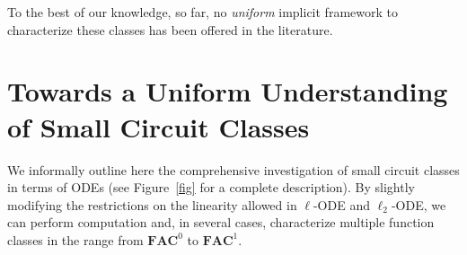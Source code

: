 \documentclass[11pt, oneside]{article}
\newcommand{\NC}{\mathbf{FNC}}
\newcommand{\TC}{\mathbf{FTC}}
\theoremstyle{definition}
\begin{document}
    To the best of our knowledge, so far, no \emph{uniform} implicit framework to characterize these classes has been offered in the literature.
























































\section{Towards a Uniform Understanding of Small Circuit Classes}\label{sec:towards}




We informally outline here the comprehensive investigation of small circuit classes in terms of ODEs (see Figure~\ref{fig} for a complete description). 
%
By slightly modifying the restrictions on the linearity allowed  in $\ell$-ODE and $\ell_2$-ODE, we can perform computation and, in several cases, characterize multiple function classes in the range from  $\mathbf{FAC}^0$  to  $\mathbf{FAC}^1$. 
\end{document}
